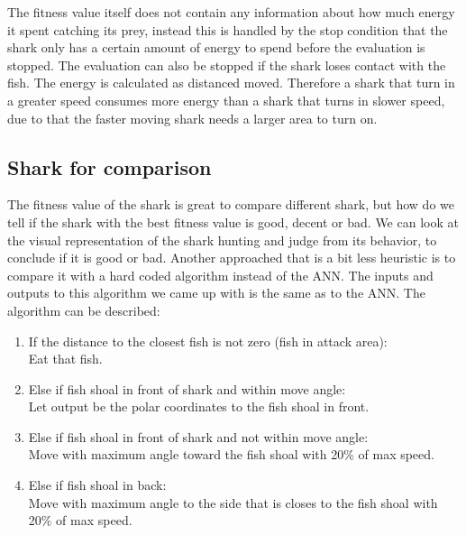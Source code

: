 The fitness value itself does not contain any information about how much energy it spent catching its prey, instead this is handled by the stop condition that the shark only has a certain amount of energy to spend before the evaluation is stopped. The evaluation can also be stopped if the shark loses contact with the fish. The energy is calculated as distanced moved. Therefore a shark that turn in a greater speed consumes more energy than a shark that turns in slower speed, due to that the faster moving shark needs a larger area to turn on.

\subsection{Shark for comparison}
The fitness value of the shark is great to compare different shark, but how do we tell if the shark with the best fitness value is good, decent or bad. We can look at the visual representation of the shark hunting and judge from its behavior, to conclude if it is good or bad. Another approached that is a bit less heuristic is to compare it with a hard coded algorithm instead of the ANN. The inputs and outputs to this algorithm we came up with is the same as to the ANN. The algorithm can be described:
\begin{enumerate}
\item If the distance to the closest fish is not zero (fish in attack area):\\
    \hspace*{5pt}Eat that fish.
\item Else if fish shoal in front of shark and within move angle: \\
    \hspace*{5pt}Let output be the polar coordinates to the fish shoal in front.
\item Else if fish shoal in front of shark and not within move angle: \\
    \hspace*{5pt}Move with maximum angle toward the fish shoal with 20\% of max speed.
\item Else if fish shoal in back:\\
    \hspace*{5pt}Move with maximum angle to the side that is closes to the fish shoal with 20\% of max speed.
\end{enumerate}

